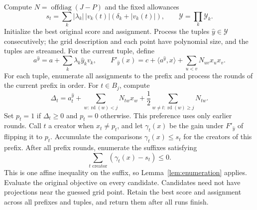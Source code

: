 \documentclass[11pt,a4paper]{article}
\theoremstyle{definition}
\theoremstyle{remark}
\begin{document}
Compute $N=\operatorname{offdiag}(J-P)$ and the fixed allowances
\[
 s_t=\sum_k|\lambda_k|\,|v_k(t)|(\delta_k+|v_k(t)|),
 \qquad \mathcal Y=\prod_k\mathcal Y_k.
\]
Initialize the best original score and assignment. Process the tuples
$\hat y\in\mathcal Y$ consecutively; the grid description and each point
have polynomial size, and the tuples are streamed. For the current
tuple, define
\[
 a^{\hat y}=a+\sum_k\lambda_k\hat y_kv_k,
 \qquad F'_{\hat y}(x)=c+\langle a^{\hat y},x\rangle+
                    \sum_{u<v}N_{uv}x_ux_v.
\]
For each tuple, enumerate all assignments to the prefix and process
the rounds of the current prefix in order. For $t\in B_j$, compute
\[
 \Delta_t=a^{\hat y}_t+\sum_{w:\operatorname{rd}(w)<j}N_{tw}x_w
             +\frac12\sum_{w\ne t:\operatorname{rd}(w)\ge j}N_{tw}.
\]
Set $p_t=1$ if $\Delta_t\ge0$ and $p_t=0$ otherwise.
This preference uses only earlier rounds. Call $t$ a creator when
$x_t\ne p_t$, and let $\gamma_t(x)$ be the gain under $F'_{\hat y}$
of flipping it to $p_t$. Accumulate the comparisons
$\gamma_t(x)\le s_t$ for the creators of this prefix.
After all prefix rounds, enumerate the suffixes satisfying
\begin{equation}
 \sum_{t\text{ creator}}(\gamma_t(x)-s_t)\le0. \label{eq:counts-sum}
\end{equation}
This is one affine inequality on the suffix, so Lemma~\ref{lem:enumeration}
applies. Evaluate the original objective on every candidate. Candidates
need not have projections near the guessed grid point. Retain the best
score and assignment across all prefixes and tuples, and return them
after all runs finish.
\end{document}
